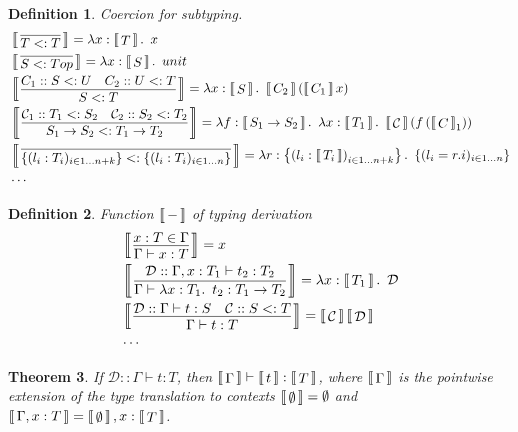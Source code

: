 \documentclass{article}
\theoremstyle{plain}
\newtheorem{theorem}{Theorem}
\newtheorem{definition}[theorem]{Definition}
\theoremstyle{nonumberplain}
\newcommand{\lam}[2]{\ensuremath{\lambda #1\ldotp~ #2}} %
\newcommand{\termtype}[2]{\ensuremath{#1:#2}}
\newcommand{\subtyp}[2]{#1<:#2}
\newcommand{\dbracket}[1]{\ensuremath{\left\llbracket\,\vcenter{\hbox{$#1$}}\,\right\rrbracket}}
\begin{document}
\begin{definition}
\rm Coercion for subtyping.
$$
\begin{aligned}
&\dbracket{\infer{\subtyp{T}{T}}{}} =  \lam{\termtype{x}{\dbracket{T}}}{x} \\
&\dbracket{\infer{\subtyp{S}{Top}}{}} =  \lam{\termtype{x}{\dbracket{S}}}{unit} \\
&\dbracket{\infer{\subtyp{S}{T}}{C_1:: \subtyp{S}{U} & C_2:: \subtyp{U}{T}}} =  \lam{\termtype{x}{\dbracket{S}}}{\dbracket{C_2}\left(\dbracket{C_1}x\right)} \\
&\dbracket{\infer{\subtyp{S_1 \to S_2}{T_1 \to T_2}}{\mathcal{C}_1:: \subtyp{T_1}{S_2} & \mathcal{C}_2:: \subtyp{S_2}{T_2}}} = \lam{\termtype{f}{\dbracket{S_1 \to S_2}}}{\lam{\termtype{x}{\dbracket{T_1}}}{\dbracket{\mathcal{C}}\left(f\left(\dbracket{C}_1\right)\right)}}\\
&\dbracket{\infer{\subtyp{\{(l_i:T_i)_{i \in 1 \ldots n+k}\}}{\{(l_i:T_i)_{i \in 1 \ldots n}\}}}{}} = \lam{\termtype{r}{\left\{\left(l_i:\dbracket{T_i}\right)_{i \in 1 \ldots n+k}\right\}}}{\{(l_i=r.i)_{i \in 1 \ldots n}\}} \\
&\cdots
\end{aligned}
$$
\end{definition}

\begin{definition}
\rm Function $\dbracket{-}$ of typing derivation
$$
\begin{aligned}
& \dbracket{\infer{\Gamma \vdash \termtype{x}{T}}{\termtype{x}{T} \in \Gamma}} = x \\
& \dbracket{\infer{\Gamma \vdash \termtype{\lam{\termtype{x}{T_1}}{t_2}}{T_1 \to T_2}}{\mathcal{D}:: \Gamma,\termtype{x}{T_1} \vdash \termtype{t_2}{T_2}}} = \lam{\termtype{x}{\dbracket{T_1}}}{\mathcal{D}}\\
&\dbracket{\infer{\Gamma \vdash \termtype{t}{T}}{\mathcal{D}:: \Gamma \vdash \termtype{t}{S} & \mathcal{C}::\subtyp{S}{T}}} = \dbracket{\mathcal{C}}\dbracket{\mathcal{D}}\\
&\cdots
\end{aligned}
$$
\end{definition}


\begin{theorem}
\rm If $\mathcal{D}::\Gamma \vdash \termtype{t}{T}$, then $\dbracket{\Gamma} \vdash \termtype{\dbracket{t}}{\dbracket{T}}$, where $\dbracket{\Gamma}$ is the pointwise extension of the type translation to contexts $\dbracket{\emptyset} = \emptyset$ and $\dbracket{\Gamma,\termtype{x}{T}} = \dbracket{\emptyset},\termtype{x}{\dbracket{T}}$. 
\end{theorem}
\end{document}
